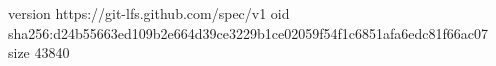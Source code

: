 version https://git-lfs.github.com/spec/v1
oid sha256:d24b55663ed109b2e664d39ce3229b1ce02059f54f1c6851afa6edc81f66ac07
size 43840
